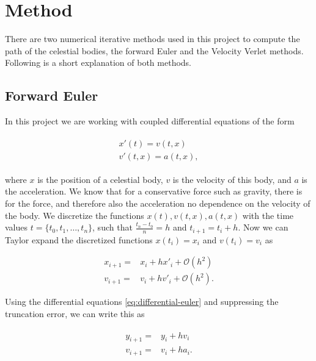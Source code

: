 \documentclass[../main.tex]{subfiles}
\begin{document}
\section{Method}\label{sec:method}

There are two numerical iterative methods used in this project to compute the path of the celestial bodies, the forward Euler and the Velocity Verlet methods. Following is a short explanation of both methods.

\subsection{Forward Euler}

In this project we are working with coupled differential equations of the form

\begin{align}
    \begin{split}
        x'(t) = v(t,x)\\
        v'(t,x) = a(t,x),
    \end{split}
    \label{eq:differential-euler}
\end{align}

where $x$ is the position of a celestial body, $v$ is the velocity of this body, and $a$ is the acceleration. We know that for a conservative force such as gravity, there is for the force, and therefore also the acceleration no dependence on the velocity of the body. We discretize the functions $x(t), v(t,x), a(t,x)$ with the time values $t = \{t_0, t_1, \ldots , t_n\}$, such that $\frac{t_n - t_0}{n} = h$ and $t_{i+1} = t_i + h$. Now we can Taylor expand the discretized functions $x(t_i) = x_i$ and $v(t_i) = v_i$ as

\begin{align*}
    x_{i+1} = & x_i + h x'_i + \mathcal{O}(h^2) \\
    v_{i+1} = & v_i + h v'_i + \mathcal{O}(h^2).
\end{align*}

Using the differential equations \cref{eq:differential-euler} and suppressing the truncation error, we can write this as

\begin{align}
    \begin{split}
        y_{i+1} = & y_i + h v_i\\
        v_{i+1} = & v_i + h a_i.
    \end{split}
    \label{eq:euler}
\end{align}
\end{document}
